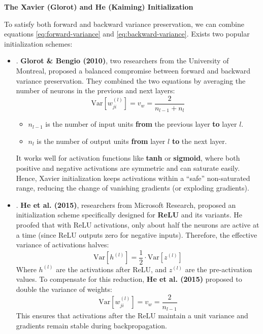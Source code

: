 \newpage

\highspace
\begin{flushleft}
    \textcolor{Green3}{ \textbf{The Xavier (Glorot) and He (Kaiming) Initialization}}
    \label{sec:xavier-and-he-initialization}
\end{flushleft}
To satisfy both forward and backward variance preservation, we can combine equations \eqref{eq:forward-variance} and \eqref{eq:backward-variance}. Exists two popular initialization schemes:
\begin{itemize}
    \item {}. \textbf{Glorot \& Bengio (2010)}, two researchers from the University of Montreal, proposed a balanced compromise between forward and backward variance preservation. They combined the two equations by averaging the number of neurons in the previous and next layers:
    \begin{equation}
        \mathrm{Var}\left[w_{ji}^{(l)}\right] = v_w = \dfrac{2}{n_{l-1} + n_{l}}
    \end{equation}
    \begin{itemize}
        \item $n_{l-1}$ is the number of input units \textbf{from} the previous layer \textbf{to} layer $l$.
        \item $n_{l}$ is the number of output units \textbf{from} layer $l$ \textbf{to} the next layer.
    \end{itemize}
    It works well for activation functions like \textbf{tanh} or \textbf{sigmoid}, where both positive and negative activations are symmetric and can saturate easily. Hence, Xavier initialization keeps activations within a ``safe'' non-saturated range, reducing the change of vanishing gradients (or exploding gradients).


    \item {}. \textbf{He et al. (2015)}, researchers from Microsoft Research, proposed an initialization scheme specifically designed for \textbf{ReLU} and its variants. He proofed that with ReLU activations, only about half the neurons are active at a time (since ReLU outputs zero for negative inputs). Therefore, the effective variance of activations halves:
    \begin{equation*}
        \mathrm{Var}\left[h^{(l)}\right] = \dfrac{1}{2} \cdot \mathrm{Var}\left[z^{(l)}\right]
    \end{equation*}
    Where $h^{(l)}$ are the activations after ReLU, and $z^{(l)}$ are the pre-activation values. To compensate for this reduction, \textbf{He et al. (2015)} proposed to double the variance of weights:
    \begin{equation}
        \mathrm{Var}\left[w_{ji}^{(l)}\right] = v_w = \dfrac{2}{n_{l-1}}
    \end{equation}
    This ensures that activations after the ReLU maintain a unit variance and gradients remain stable during backpropagation.
\end{itemize}
